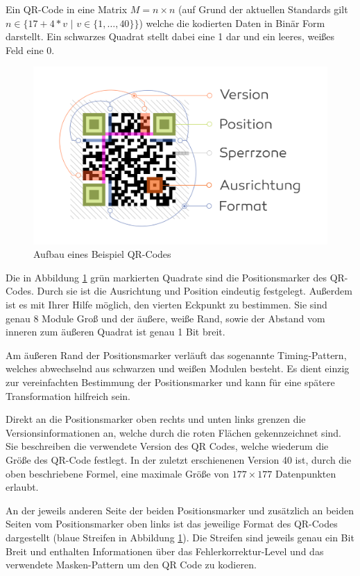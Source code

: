 \documentclass[a4paper, oneside, 12pt]{article}
\begin{document}
Ein QR-Code in eine Matrix $M = n \times n$ \Big(auf Grund der aktuellen Standards gilt $n \in \big\{17+4*v \,\, | \,\, v \in  \{1,\dots, 40\}\big\}$\Big) welche die kodierten Daten in Binär Form darstellt. Ein schwarzes Quadrat stellt dabei eine 1 dar und ein leeres, weißes Feld eine 0.

\begin{figure}[h]
	\includegraphics[width=\textwidth]{images/aufbau.png}
	\caption{Aufbau eines Beispiel QR-Codes}
	\label{fig:aufbau}
\end{figure}

Die in Abbildung \ref{fig:aufbau} grün markierten Quadrate sind die Positionsmarker des QR-Codes. Durch sie ist die Ausrichtung und Position eindeutig festgelegt. Außerdem ist es mit Ihrer Hilfe möglich, den vierten Eckpunkt zu bestimmen. Sie sind genau 8 Module Groß und der äußere, weiße Rand, sowie der Abstand vom inneren zum äußeren Quadrat ist genau 1 Bit breit.

Am äußeren Rand der Positionsmarker verläuft das sogenannte Timing-Pattern, welches abwechselnd aus schwarzen und weißen Modulen besteht. Es dient einzig zur vereinfachten Bestimmung der Positionsmarker und kann für eine spätere Transformation hilfreich sein.

Direkt an die Positionsmarker oben rechts und unten links grenzen die Versionsinformationen an,  welche durch die roten Flächen gekennzeichnet sind. Sie beschreiben die verwendete Version des QR Codes, welche wiederum die Größe des QR-Code festlegt. In der zuletzt erschienenen Version 40 ist, durch die oben beschriebene Formel, eine maximale Größe von $177 \times 177$ Datenpunkten erlaubt.

An der jeweils anderen Seite der beiden Positionsmarker und zusätzlich an beiden Seiten vom Positionsmarker oben links ist das jeweilige Format des QR-Codes dargestellt (blaue Streifen in Abbildung \ref{fig:aufbau}). Die Streifen sind jeweils genau ein Bit Breit und enthalten Informationen über das Fehlerkorrektur-Level und das verwendete Masken-Pattern um den QR Code zu kodieren.%
\end{document}
